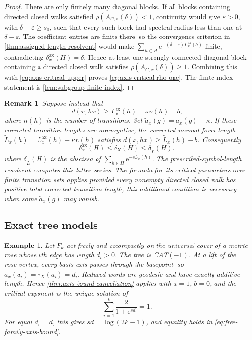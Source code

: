 \documentclass[11pt]{article}
\newtheorem{remark}[remark]{Remark}
\newtheorem{example}[example]{Example}
\theoremstyle{definition}
\newcommand{\ax}{\mathrm{ax}}
\newcommand{\e}{\mathrm e}
\begin{document}
\begin{proof}
There are only finitely many diagonal blocks.  If all blocks containing directed closed walks
satisfied $\rho(A_{C,x}(\delta))<1$, continuity would give $\varepsilon>0$, with
$\delta-\varepsilon\ge s_0$, such that every such block had spectral radius less than one at
$\delta-\varepsilon$.  The coefficient entries are finite there, so the convergence criterion
in \cref{thm:assigned-length-resolvent} would make
$\sum_{h\in H}\e^{-(\delta-\varepsilon)L^{\ax}_x(h)}$ finite, contradicting
$\delta_x^{\ax}(H)=\delta$.  Hence at least one strongly connected diagonal block containing a directed closed walk satisfies
$\rho(A_{C,x}(\delta))\ge1$.  Combining this with
\eqref{eq:axis-critical-upper} proves \eqref{eq:axis-critical-rho-one}.  The finite-index
statement is \cref{lem:subgroup-finite-index}.
\end{proof}

\begin{remark}
Suppose instead that
\[
 d(x,hx)\ge L^{\ax}_x(h)-\kappa n(h)-b,
\]
where $n(h)$ is the number of transitions.  Set
$\widetilde a_x(g)=a_x(g)-\kappa$.  If these corrected transition lengths are nonnegative,
the corrected normal-form length
$\widetilde L_x(h)=L^{\ax}_x(h)-\kappa n(h)$ satisfies
$d(x,hx)\ge\widetilde L_x(h)-b$.  Consequently
\[
 \delta^{\ax}_x(H)\le\delta_X(H)\le\delta_{\widetilde L}(H),
\]
where $\delta_{\widetilde L}(H)$ is the abscissa of
$\sum_{h\in H}\e^{-s\widetilde L_x(h)}$.  The prescribed-symbol-length resolvent computes
this latter series.  The formula for its critical parameters over finite transition sets applies provided every
nonempty directed closed walk has positive total corrected transition length; this additional condition
is necessary when some $\widetilde a_x(g)$ may vanish.
\end{remark}

\subsection{Exact tree models}

\begin{example}
\label{ex:weighted-free-tree}
Let $F_k$ act freely and cocompactly on the universal cover of a metric rose whose $i$th edge
has length $d_i>0$.  The tree is CAT$(-1)$.  At a lift of the rose vertex, every basis axis
passes through the basepoint, so $a_x(a_i)=\tau_X(a_i)=d_i$.  Reduced words are geodesic and
have exactly additive length.  Hence \cref{thm:axis-bound-cancellation} applies with
$a=1$, $b=0$, and the critical exponent is the unique solution of
\begin{equation}\label{eq:weighted-rose-equation}
 \sum_{i=1}^k\frac{2}{1+\e^{s d_i}}=1.
\end{equation}
For equal $d_i=d$, this gives $sd=\log(2k-1)$, and equality holds in
\eqref{eq:free-family-axis-bound}.
\end{example}
\end{document}
